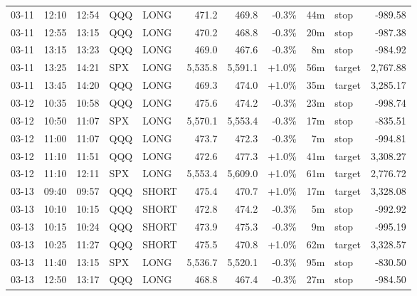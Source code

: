 \documentclass[11pt,a4paper,twoside]{article}
\begin{document}
\begin{center}
\begin{longtable}{>{\color{txtmain}}l l l l l r r r r >{\color{txtmain}}l r}
03-11 & 12:10 & 12:54 & QQQ & LONG & 471.2 & 469.8 & \textcolor{lossred}{-0.3\%} & 44m & stop & \textcolor{lossred}{-989.58} \\
03-11 & 12:55 & 13:15 & QQQ & LONG & 470.2 & 468.8 & \textcolor{lossred}{-0.3\%} & 20m & stop & \textcolor{lossred}{-987.38} \\
03-11 & 13:15 & 13:23 & QQQ & LONG & 469.0 & 467.6 & \textcolor{lossred}{-0.3\%} & 8m & stop & \textcolor{lossred}{-984.92} \\
03-11 & 13:25 & 14:21 & SPX & LONG & 5,535.8 & 5,591.1 & \textcolor{wingreen}{+1.0\%} & 56m & target & \textcolor{wingreen}{2,767.88} \\
03-11 & 13:45 & 14:20 & QQQ & LONG & 469.3 & 474.0 & \textcolor{wingreen}{+1.0\%} & 35m & target & \textcolor{wingreen}{3,285.17} \\
03-12 & 10:35 & 10:58 & QQQ & LONG & 475.6 & 474.2 & \textcolor{lossred}{-0.3\%} & 23m & stop & \textcolor{lossred}{-998.74} \\
03-12 & 10:50 & 11:07 & SPX & LONG & 5,570.1 & 5,553.4 & \textcolor{lossred}{-0.3\%} & 17m & stop & \textcolor{lossred}{-835.51} \\
03-12 & 11:00 & 11:07 & QQQ & LONG & 473.7 & 472.3 & \textcolor{lossred}{-0.3\%} & 7m & stop & \textcolor{lossred}{-994.81} \\
03-12 & 11:10 & 11:51 & QQQ & LONG & 472.6 & 477.3 & \textcolor{wingreen}{+1.0\%} & 41m & target & \textcolor{wingreen}{3,308.27} \\
03-12 & 11:10 & 12:11 & SPX & LONG & 5,553.4 & 5,609.0 & \textcolor{wingreen}{+1.0\%} & 61m & target & \textcolor{wingreen}{2,776.72} \\
03-13 & 09:40 & 09:57 & QQQ & SHORT & 475.4 & 470.7 & \textcolor{wingreen}{+1.0\%} & 17m & target & \textcolor{wingreen}{3,328.08} \\
03-13 & 10:10 & 10:15 & QQQ & SHORT & 472.8 & 474.2 & \textcolor{lossred}{-0.3\%} & 5m & stop & \textcolor{lossred}{-992.92} \\
03-13 & 10:15 & 10:24 & QQQ & SHORT & 473.9 & 475.3 & \textcolor{lossred}{-0.3\%} & 9m & stop & \textcolor{lossred}{-995.19} \\
03-13 & 10:25 & 11:27 & QQQ & SHORT & 475.5 & 470.8 & \textcolor{wingreen}{+1.0\%} & 62m & target & \textcolor{wingreen}{3,328.57} \\
03-13 & 11:40 & 13:15 & SPX & LONG & 5,536.7 & 5,520.1 & \textcolor{lossred}{-0.3\%} & 95m & stop & \textcolor{lossred}{-830.50} \\
03-13 & 12:50 & 13:17 & QQQ & LONG & 468.8 & 467.4 & \textcolor{lossred}{-0.3\%} & 27m & stop & \textcolor{lossred}{-984.50} \\

\end{longtable}
\end{center}
\end{document}
